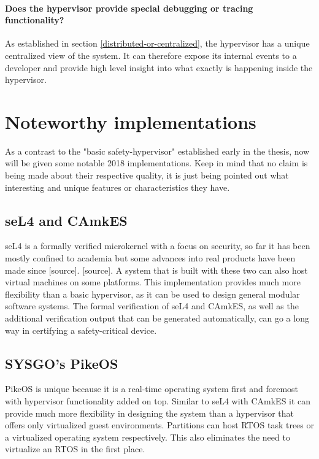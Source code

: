 \paragraph{Does the hypervisor provide special debugging or tracing functionality?}
As established in section \ref{distributed-or-centralized}, the hypervisor has a unique centralized view of the system. It can therefore expose its internal events to a developer and provide high level insight into what exactly is happening inside the hypervisor.


\section{Noteworthy implementations} \label{noteworthy-implementations}
As a contrast to the "basic safety-hypervisor" established early in the thesis, now will be given some notable 2018 implementations. Keep in mind that no claim is being made about their respective quality, it is just being pointed out what interesting and unique features or characteristics they have.
\subsection{seL4 and CAmkES} \label{seL4}
seL4 is a formally verified microkernel with a focus on security, so far it has been mostly confined to academia but some advances into real products have been made since [source]. [source]. A system that is built with these two can also host virtual machines on some platforms. This implementation provides much more flexibility than a basic hypervisor, as it can be used to design general modular software systems. The formal verification of seL4 and CAmkES, as well as the additional verification output that can be generated automatically, can go a long way in certifying a safety-critical device.
\subsection{SYSGO's PikeOS}
PikeOS is unique because it is a real-time operating system first and foremost with hypervisor functionality added on top. Similar to seL4 with CAmkES it can provide much more flexibility in designing the system than a hypervisor that offers only virtualized guest environments. Partitions can host \gls{RTOS} task trees or a virtualized operating system respectively. This also eliminates the need to virtualize an \gls{RTOS} in the first place.

